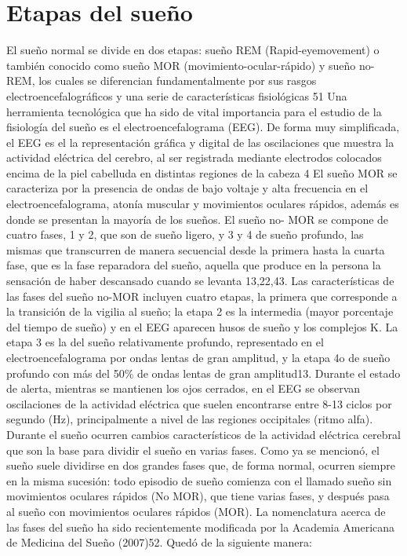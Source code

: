 \documentclass[12pt,a4paper]{mitthesis}
\begin{document}
\section{Etapas del sue\~no}

El sueño normal se divide en dos etapas: sueño REM (Rapid-eyemovement) o también conocido como sueño MOR (movimiento-ocular-rápido) y sueño no-REM, los cuales se diferencian fundamentalmente por sus rasgos electroencefalográficos y una serie de características fisiológicas 51
Una herramienta tecnológica que ha sido de vital importancia para el estudio de la fisiología del sueño es el electroencefalograma (EEG). De forma muy simplificada, el EEG es el la representación gráfica y digital de las oscilaciones que muestra la actividad eléctrica del cerebro, al ser registrada mediante electrodos colocados encima de la piel cabelluda en distintas regiones de la cabeza 4
El sueño MOR se caracteriza por la presencia de ondas de bajo voltaje y alta frecuencia en el electroencefalograma, atonía muscular y movimientos oculares rápidos, además es donde se presentan la mayoría de los sueños. El sueño no- MOR se compone de cuatro fases, 1 y 2, que son de sueño ligero, y 3 y 4 de sueño profundo, las mismas que transcurren de manera secuencial desde la primera hasta la cuarta fase, que es la fase reparadora del sueño, aquella que produce en la persona la sensación de haber descansado cuando se levanta 13,22,43.
Las características de las fases del sueño no-MOR incluyen cuatro etapas, la primera que corresponde a la transición de la vigilia al sueño; la etapa 2 es la intermedia (mayor porcentaje del tiempo de sueño) y en el EEG aparecen husos de sueño y los complejos K. La etapa 3 es la del sueño relativamente profundo, representado en el electroencefalograma por ondas lentas de gran amplitud, y la etapa 4o de sueño profundo con más del 50\% de ondas lentas de gran amplitud13.
	Durante el estado de alerta, mientras se mantienen los ojos cerrados, en el EEG se observan oscilaciones de la actividad eléctrica que suelen encontrarse entre 8-13 ciclos por segundo (Hz), principalmente a nivel de las regiones occipitales (ritmo alfa). Durante el sueño ocurren cambios característicos de la actividad eléctrica cerebral que son la base para dividir el sueño en varias fases. Como ya se mencionó, el sueño suele dividirse en dos grandes fases que, de forma normal, ocurren siempre en la misma sucesión: todo episodio de sueño comienza con el llamado sueño sin movimientos oculares rápidos (No MOR), que tiene varias fases, y después pasa al sueño con movimientos oculares rápidos (MOR). La nomenclatura acerca de las fases del sueño ha sido recientemente modificada por la Academia Americana de Medicina del Sueño (2007)52. Quedó de la siguiente manera:
\end{document}
